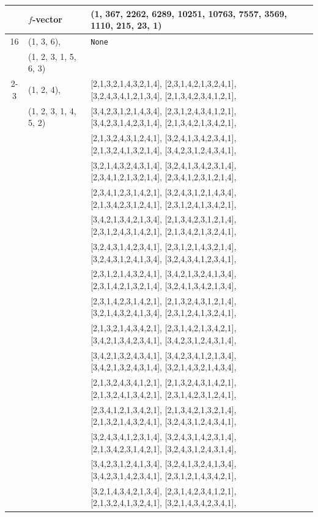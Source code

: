 \documentclass[10pt]{amsart}
\numberwithin{equation}{section}
\theoremstyle{plain}
\theoremstyle{definition}
\theoremstyle{remark}
\begin{document}
{\begin{longtable}{c|l|l}
		& $f$-vector & {(1, 367, 2262, 6289, 10251, 10763, 7557, 3569, 1110, 215, 23, 1)} \\
		\midrule
		
		16 & (1, 3, 6), & \texttt{None} \\
		& (1, 2, 3, 1, 5, 6, 3) &  \\ \cline{2-3}
		
		& (1, 2, 4), & [2,1,3,2,1,4,3,2,1,4], [2,3,1,4,2,1,3,2,4,1], [3,2,4,3,4,1,2,1,3,4], [2,1,3,4,2,3,4,1,2,1], \\
		& (1, 2, 3, 1, 4, 5, 2) & [3,4,2,3,1,2,1,4,3,4], [2,3,1,2,4,3,4,1,2,1], [3,4,2,3,1,4,2,3,1,4], [2,1,3,4,2,1,3,4,2,1], \\
		&  & [2,1,3,2,4,3,1,2,4,1], [3,2,4,1,3,4,2,3,4,1], [2,1,3,2,4,1,3,2,1,4], [3,4,2,3,1,2,4,3,4,1], \\
		&  & [3,2,1,4,3,2,4,3,1,4], [3,2,4,1,3,4,2,3,1,4], [2,3,4,1,2,1,3,2,1,4], [2,3,4,1,2,3,1,2,1,4], \\
		&  & [2,3,4,1,2,3,1,4,2,1], [3,2,4,3,1,2,1,4,3,4], [2,1,3,4,2,3,1,2,4,1], [2,3,1,2,4,1,3,4,2,1], \\
		&  & [3,4,2,1,3,4,2,1,3,4], [2,1,3,4,2,3,1,2,1,4], [2,3,1,2,4,3,1,4,2,1], [2,1,3,4,2,1,3,2,4,1], \\
		&  & [3,2,4,3,1,4,2,3,4,1], [2,3,1,2,1,4,3,2,1,4], [3,2,4,3,1,2,4,1,3,4], [3,2,4,3,4,1,2,3,4,1], \\
		&  & [2,3,1,2,1,4,3,2,4,1], [3,4,2,1,3,2,4,1,3,4], [2,3,1,4,2,1,3,2,1,4], [3,2,4,1,3,4,2,1,3,4], \\
		&  & [2,3,1,4,2,3,1,4,2,1], [2,1,3,2,4,3,1,2,1,4], [3,2,1,4,3,2,4,1,3,4], [2,3,1,2,4,1,3,2,4,1], \\
		&  & [2,1,3,2,1,4,3,4,2,1], [2,3,1,4,2,1,3,4,2,1], [3,4,2,1,3,4,2,3,4,1], [3,4,2,3,1,2,4,3,1,4], \\
		&  & [3,4,2,1,3,2,4,3,4,1], [3,4,2,3,4,1,2,1,3,4], [3,4,2,1,3,2,4,3,1,4], [3,2,1,4,3,2,1,4,3,4], \\
		&  & [2,1,3,2,4,3,4,1,2,1], [2,1,3,2,4,3,1,4,2,1], [2,1,3,2,4,1,3,4,2,1], [2,3,1,4,2,3,1,2,4,1], \\
		&  & [2,3,4,1,2,1,3,4,2,1], [2,1,3,4,2,1,3,2,1,4], [2,1,3,2,1,4,3,2,4,1], [3,2,4,3,1,2,4,3,4,1], \\
		&  & [3,2,4,3,4,1,2,3,1,4], [3,2,4,3,1,4,2,3,1,4], [2,1,3,4,2,3,1,4,2,1], [3,2,4,3,1,2,4,3,1,4], \\
		&  & [3,4,2,3,1,2,4,1,3,4], [3,2,4,1,3,2,4,1,3,4], [3,4,2,3,1,4,2,3,4,1], [2,3,1,2,1,4,3,4,2,1], \\
		&  & [3,2,1,4,3,4,2,1,3,4], [2,3,1,4,2,3,4,1,2,1], [2,1,3,2,4,1,3,2,4,1], [3,2,1,4,3,4,2,3,4,1], \\

\end{longtable}}
\end{document}
